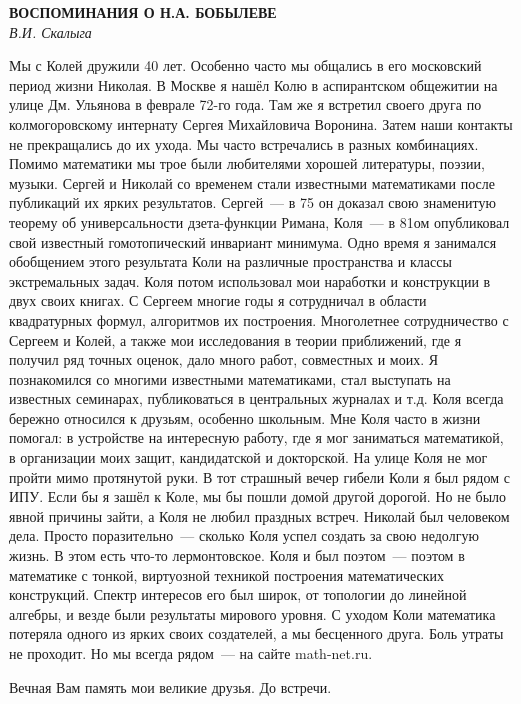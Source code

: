 \begin{center}{ \bf  ВОСПОМИНАНИЯ О Н.А. БОБЫЛЕВЕ}\\
{\it В.И. Скалыга} \\
\end{center}
Мы с Колей дружили 40 лет. Особенно часто мы общались в его московский период жизни Николая.
В Москве я нашёл Колю в аспирантском общежитии на улице Дм. Ульянова в феврале 72-го  года.
Там же   я встретил   своего друга по колмогоровскому интернату Сергея  Михайловича Воронина.
Затем наши контакты не прекращались до их ухода. Мы часто встречались в разных комбинациях.
Помимо математики мы трое были любителями хорошей литературы, поэзии, музыки.
Сергей и Николай со временем стали  известными математиками после публикаций их ярких результатов.
Сергей~--- в 75 он  доказал свою знаменитую теорему об универсальности дзета-функции Римана,
Коля~--- в  81ом опубликовал свой известный гомотопический инвариант минимума.
Одно время я занимался обобщением этого результата Коли на различные   пространства  и классы экстремальных задач.
Коля потом использовал мои наработки и конструкции в двух своих книгах.
С Сергеем многие годы я сотрудничал в области квадратурных формул, алгоритмов их построения.
Многолетнее сотрудничество с Сергеем и Колей, а также мои исследования в теории приближений, где я получил ряд точных оценок,
дало много работ, совместных и моих.
Я познакомился со многими известными математиками, стал выступать на известных семинарах,
публиковаться в центральных журналах и т.д.
Коля всегда бережно относился к друзьям, особенно школьным.
Мне Коля часто в жизни помогал: в  устройстве на интересную работу, где я мог заниматься математикой,
в организации  моих защит, кандидатской и докторской. На улице Коля не мог пройти мимо протянутой руки.
В тот страшный вечер гибели  Коли я был рядом с ИПУ.  Если бы я зашёл к Коле, мы бы пошли домой другой дорогой.
Но не было явной причины зайти, а Коля не любил праздных встреч. Николай был человеком дела.
Просто поразительно~--- сколько Коля успел создать за свою недолгую жизнь. В  этом есть что-то лермонтовское.
Коля и был поэтом~--- поэтом в математике с  тонкой, виртуозной техникой построения математических конструкций.
Спектр интересов его был широк, от топологии до линейной алгебры, и везде были результаты  мирового уровня.
С уходом Коли математика потеряла одного из ярких своих создателей, а мы бесценного друга.
Боль утраты не проходит. Но мы  всегда рядом~--- на сайте  math-net.ru.

Вечная Вам память мои великие друзья.   До встречи.



